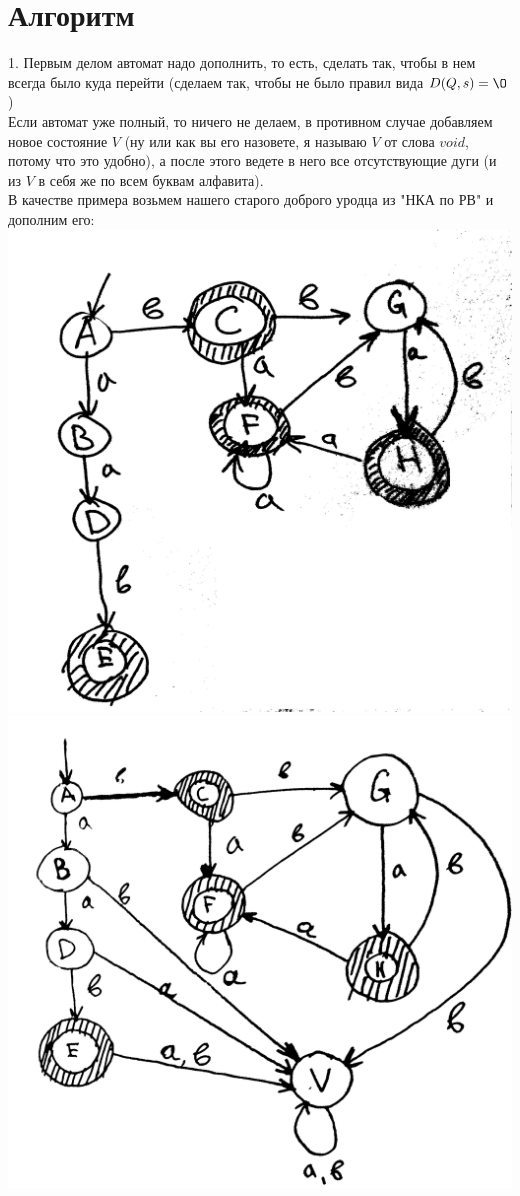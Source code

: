 \documentclass[14pt]{extreport}
\begin{document}
	\section{Алгоритм}
	1. Первым делом автомат надо дополнить, то есть, сделать так, чтобы в нем всегда было куда
	перейти (сделаем так, чтобы не было правил вида $D(Q, s) = \O$)\\
	Если автомат уже полный, то ничего не делаем, в противном случае добавляем новое состояние
	$V$ (ну или как вы его назовете, я называю $V$ от слова $void$, потому что это удобно), а
	после этого ведете в него все отсутствующие дуги (и из $V$ в себя же по всем буквам
	алфавита).\\
	В качестве примера возьмем нашего старого доброго уродца из "НКА по РВ" и дополним его:\\
	\includegraphics[scale=0.1]{data/pic2_2.png} \includegraphics[scale=0.08]{data/pic4_1.png}
\end{document}
